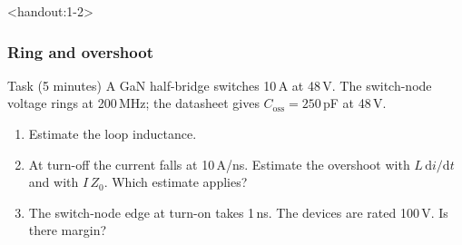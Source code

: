 \begin{frame}<handout:1-2>
	\frametitle{Ring and overshoot}
	\begin{block}{Task (5 minutes)}
		A GaN half-bridge switches 10\,A at 48\,V. The switch-node voltage rings at 200\,MHz; the datasheet gives $C_\mathrm{oss}=250$\,pF at 48\,V.
		\begin{enumerate}
			\item Estimate the loop inductance.
			\item At turn-off the current falls at 10\,A/ns. Estimate the overshoot with $L\,\mathrm{d}i/\mathrm{d}t$ and with $I\,Z_0$. Which estimate applies?
			\item The switch-node edge at turn-on takes 1\,ns. The devices are rated 100\,V. Is there margin?
		\end{enumerate}
	\end{block}
\end{frame}

